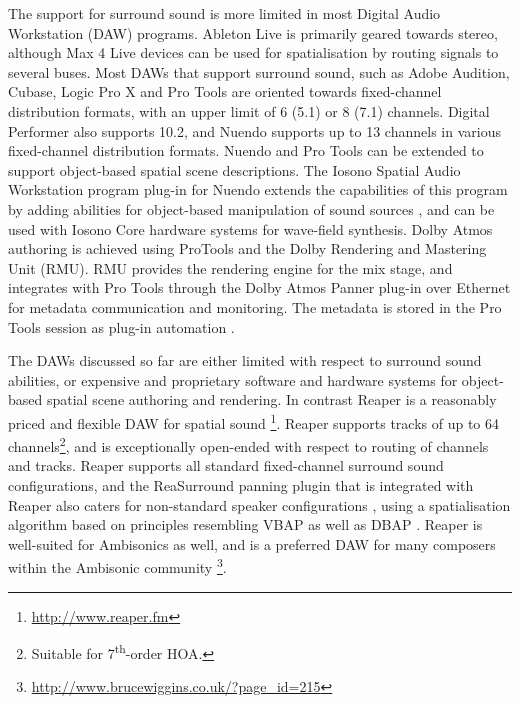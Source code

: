 \documentclass{article}
\begin{document}
The support for surround sound is more limited in most Digital Audio Workstation (DAW) programs.
Ableton Live is primarily geared towards stereo, although Max 4 Live devices can be used for spatialisation by routing signals to several buses.
Most DAWs that support surround sound, such as Adobe Audition, Cubase, Logic Pro X and Pro Tools are oriented towards fixed-channel distribution formats, with an upper limit of 6 (5.1) or 8 (7.1) channels.
Digital Performer also supports 10.2, and Nuendo supports up to 13 channels in various fixed-channel distribution formats.
Nuendo and Pro Tools can be extended to support object-based spatial scene descriptions.
The Iosono Spatial Audio Workstation program plug-in for Nuendo extends the capabilities of this program by adding abilities for object-based manipulation of sound sources \cite{iosono2012:workstation}, and can be used with Iosono Core hardware systems for wave-field synthesis.
Dolby Atmos authoring is achieved using ProTools and the Dolby Rendering and Mastering Unit (RMU).
RMU provides the rendering engine for the mix stage, and integrates with Pro Tools through the Dolby Atmos Panner plug-in over Ethernet for metadata communication and monitoring. 
The metadata is stored in the Pro Tools session as plug-in automation \cite{dolby:2013authoring}.

The DAWs discussed so far are either limited with respect to surround sound abilities, or expensive and proprietary software and hardware systems for object-based spatial scene authoring and rendering.
In contrast Reaper is a reasonably priced and flexible DAW for spatial sound \footnote{\href{http://www.reaper.fm}{http://www.reaper.fm}}.
Reaper supports tracks of up to 64 channels\footnote{Suitable for 7\textsuperscript{th}-order HOA.}, and is exceptionally open-ended with respect to routing of channels and tracks.
Reaper supports all standard fixed-channel surround sound configurations, and the ReaSurround panning plugin that is integrated with Reaper also caters for non-standard speaker configurations \cite{francis:2014_reaper}, using a spatialisation algorithm based on principles resembling VBAP \cite{Pulkki:1997vbap} as well as DBAP \cite{Lossius:2009dbap}.
Reaper is well-suited for Ambisonics as well, and is a preferred DAW for many composers within the Ambisonic  community \footnote{\href{http://www.brucewiggins.co.uk/?page\_id=215}{http://www.brucewiggins.co.uk/?page\_id=215}}.
\end{document}
